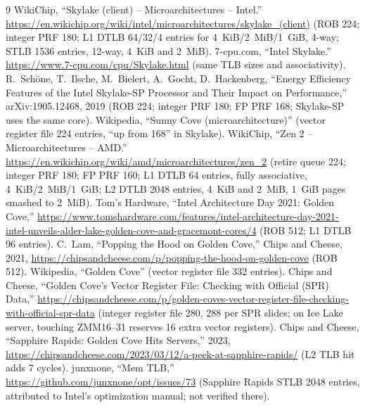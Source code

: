\documentclass[11pt]{article}
\begin{document}
\begin{thebibliography}{9}
\small
{} WikiChip, ``Skylake (client) -- Microarchitectures -- Intel.''
  \url{https://en.wikichip.org/wiki/intel/microarchitectures/skylake_(client)}
  (ROB 224; integer PRF 180; L1 DTLB 64/32/4 entries for 4~KiB/2~MiB/1~GiB, 4-way;
  STLB 1536 entries, 12-way, 4~KiB and 2~MiB).
 7-cpu.com, ``Intel Skylake.''
  \url{https://www.7-cpu.com/cpu/Skylake.html} (same TLB sizes and associativity).
 R.~Sch\"one, T.~Ilsche, M.~Bielert, A.~Gocht, D.~Hackenberg,
  ``Energy Efficiency Features of the Intel Skylake-SP Processor and Their
  Impact on Performance,'' arXiv:1905.12468, 2019 (ROB 224; integer PRF 180;
  FP PRF 168; Skylake-SP uses the same core).
 Wikipedia, ``Sunny Cove (microarchitecture)''
  (vector register file 224 entries, ``up from 168'' in Skylake).
 WikiChip, ``Zen 2 -- Microarchitectures -- AMD.''
  \url{https://en.wikichip.org/wiki/amd/microarchitectures/zen_2}
  (retire queue 224; integer PRF 180; FP PRF 160; L1 DTLB 64 entries, fully
  associative, 4~KiB/2~MiB/1~GiB; L2 DTLB 2048 entries, 4~KiB and 2~MiB, 1~GiB
  pages smashed to 2~MiB).
 Tom's Hardware, ``Intel Architecture Day 2021: Golden Cove,''
  \url{https://www.tomshardware.com/features/intel-architecture-day-2021-intel-unveils-alder-lake-golden-cove-and-gracemont-cores/4}
  (ROB 512; L1 DTLB 96 entries).
 C.~Lam, ``Popping the Hood on Golden Cove,'' Chips and Cheese, 2021,
  \url{https://chipsandcheese.com/p/popping-the-hood-on-golden-cove} (ROB 512).
 Wikipedia, ``Golden Cove'' (vector register file 332 entries).
 Chips and Cheese, ``Golden Cove's Vector Register File:
  Checking with Official (SPR) Data,''
  \url{https://chipsandcheese.com/p/golden-coves-vector-register-file-checking-with-official-spr-data}
  (integer register file 280, 288 per SPR slides; on Ice Lake server, touching
  ZMM16--31 reserves 16 extra vector registers).
 Chips and Cheese, ``Sapphire Rapids: Golden Cove Hits Servers,'' 2023,
  \url{https://chipsandcheese.com/2023/03/12/a-peek-at-sapphire-rapids/}
  (L2 TLB hit adds 7 cycles).
 junxnone, ``Mem TLB,''
  \url{https://github.com/junxnone/opt/issues/73} (Sapphire Rapids STLB 2048
  entries, attributed to Intel's optimization manual; not verified there).
\end{thebibliography}
\end{document}
